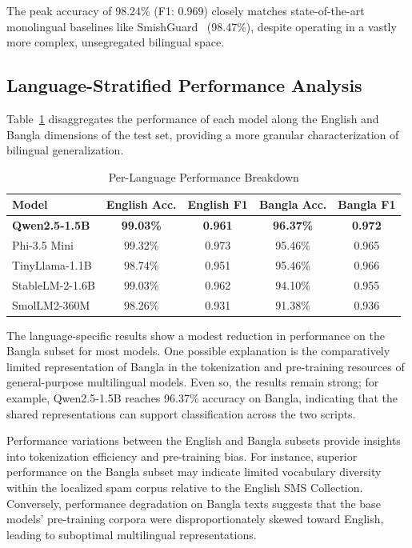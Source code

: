 \documentclass[journal]{IEEEtran}
\begin{document}
The peak accuracy of 98.24\% (F1: 0.969) closely matches state-of-the-art monolingual baselines like SmishGuard~\cite{ref6} (98.47\%), despite operating in a vastly more complex, unsegregated bilingual space.

\subsection{Language-Stratified Performance Analysis}

Table~\ref{tab:lang_results} disaggregates the performance of each model along the English
and Bangla dimensions of the test set, providing a more granular
characterization of bilingual generalization.

\begin{table}[htbp]
\caption{Per-Language Performance Breakdown}
\label{tab:lang_results}
\centering
\begin{tabular}{lcccc}
\toprule
\textbf{Model} & \textbf{English Acc.} & \textbf{English F1} & \textbf{Bangla Acc.} & \textbf{Bangla F1} \\
\midrule
\rowcolor{gray!20} \textbf{Qwen2.5-1.5B} & \textbf{99.03\%} & \textbf{0.961} & \textbf{96.37\%} & \textbf{0.972} \\
Phi-3.5 Mini & 99.32\% & 0.973 & 95.46\% & 0.965 \\
TinyLlama-1.1B & 98.74\% & 0.951 & 95.46\% & 0.966 \\
StableLM-2-1.6B & 99.03\% & 0.962 & 94.10\% & 0.955 \\
SmolLM2-360M & 98.26\% & 0.931 & 91.38\% & 0.936 \\
\bottomrule
\end{tabular}
\end{table}



The language-specific results show a modest reduction in performance on the Bangla subset for most models. One possible explanation is the comparatively limited representation of Bangla in the tokenization and pre-training resources of general-purpose multilingual models. Even so, the results remain strong; for example, Qwen2.5-1.5B reaches 96.37\% accuracy on Bangla, indicating that the shared representations can support classification across the two scripts.

Performance variations between the English and Bangla subsets provide insights into tokenization efficiency and pre-training bias. For instance, superior performance on the Bangla subset may indicate limited vocabulary diversity within the localized spam corpus relative to the English SMS Collection. Conversely, performance degradation on Bangla texts suggests that the base models' pre-training corpora were disproportionately skewed toward English, leading to suboptimal multilingual representations.
\end{document}
